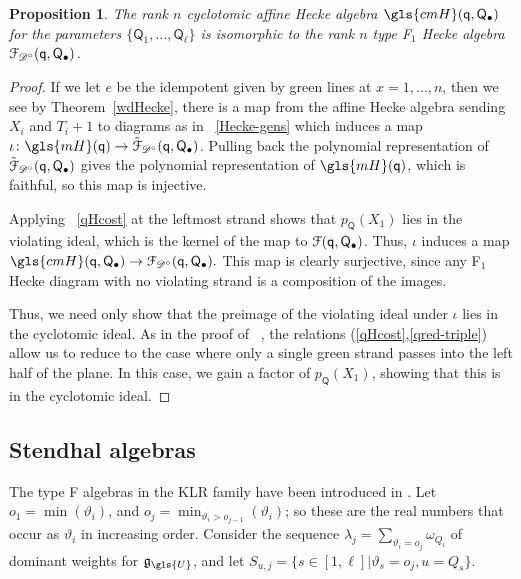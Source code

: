 \documentclass[10pt]{article}
\newtheorem{prop}[theorem]{Proposition}
\theoremstyle{definition}
\newcommand{\pq}{\mathsf{q}}
\newcommand{\la}{\lambda}
\newcommand{\PQ}{\mathsf{Q}}
\begin{document}
\begin{prop}\label{prop:cyclo-Hecke}
 The rank $n$ cyclotomic affine Hecke algebra $\gls{cmH}(\pq,\PQ_\bullet)$ for the parameters $\{\PQ_1,\dots,
 \PQ_\ell\}$ is isomorphic to the rank $n$ type F$_1$ Hecke algebra
 $\EuScript{F}_{\mathscr{D}^\circ} (\pq,\PQ_{\bullet})$.
\end{prop}
\begin{proof}
 If we let $e$ be the idempotent given by green lines at $x=1,\dots, 
 n$, then we see by Theorem~\ref{wdHecke}, there is a map from the
 affine Hecke algebra sending $X_i$ and $T_i+1$ to diagrams as in
~\eqref{Hecke-gens} which induces a map
 $\iota\colon \gls{mH}(\pq)\to \EuScript{\tilde F}_{\mathscr{D}^\circ}
 (\pq,\PQ_{\bullet})$. 
Pulling back the polynomial representation of $\EuScript{\tilde F}_{\mathscr{D}^\circ}
 (\pq,\PQ_{\bullet})$ gives the polynomial representation of
 $\gls{mH}(\pq)$, which is faithful, so this map is injective.

 Applying 
~\eqref{qHcost} at the leftmost strand shows that $p_\PQ(X_1)$ lies
 in the violating ideal, which is the kernel of the map to
 $\EuScript{F}(\pq,\PQ_{\bullet})$. Thus, $\iota$ induces a
 map $\gls{cmH}(\pq,\PQ_\bullet)\to \EuScript{F}_{\mathscr{D}^\circ}
 (\pq,\PQ_{\bullet}). $ This map is clearly surjective, since any
 F$_1$ Hecke diagram with no violating strand is a composition of the
 images.
 
 Thus, we need only show that the preimage of
 the violating ideal under $\iota$ lies in the cyclotomic ideal. As in the proof of
~\cite[3.16]{Webmerged}, the relations (\ref{qHcost},\ref{qred-triple})
 allow us to reduce to the case where only a single green strand
 passes into the left half of the plane. In this case, we gain a
 factor of $p_\PQ(X_1)$, showing that this is in the cyclotomic
 ideal. 
\end{proof}

\subsection{Stendhal algebras}
\label{sec:stendhal-algebras}


The type F algebras in the KLR family have been introduced in
\cite{Webmerged}. 
Let $o_1=\min(\vartheta_i)$, and
$o_j=\min_{\vartheta_i>o_{j-1}}(\vartheta_i)$; so these are the real
numbers that occur as $\vartheta_i$ in increasing order.
Consider the sequence $\la_j=\sum_{\vartheta_i=o_j}\omega_{Q_i}$ of
dominant weights for $\mathfrak{g}_{\gls{U}}$, and let $S_{u,j}=\{s\in
[1,\ell]|\vartheta_s=o_j, u=Q_s\}$.
\end{document}
